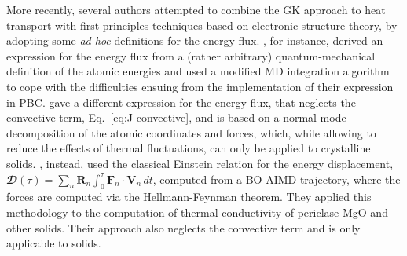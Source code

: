 More recently, several authors attempted to combine the GK approach to heat transport with first-principles techniques based on electronic-structure theory, by adopting some \emph{ad hoc} definitions for the energy flux. \citet{Kang2017}, for instance, derived an expression for the energy flux from a (rather arbitrary) quantum-mechanical definition of the atomic energies and used a modified MD integration algorithm to cope with the difficulties ensuing from the implementation of their expression in PBC. 
\citet{Carbogno:2017gc} gave a different expression for the energy flux, that neglects the convective term, Eq.~\eqref{eq:J-convective}, and is based on a normal-mode decomposition of the atomic coordinates and forces, which, while allowing to reduce the effects of thermal fluctuations, can only be applied to crystalline solids.
\citet{English2017}, instead, used the classical Einstein relation for the energy displacement, $\mathbfcal{D}(\tau) = \sum_n \mathbf{R}_n \int_0^\tau \mathbf{F}_n \cdot \mathbf{V}_n \, dt$, computed from a BO-AIMD trajectory, where the forces are computed via the Hellmann-Feynman theorem. They applied this methodology to the computation of thermal conductivity of periclase MgO \cite{Tse2018} and other solids. Their approach also neglects the convective term and is only applicable to solids.




